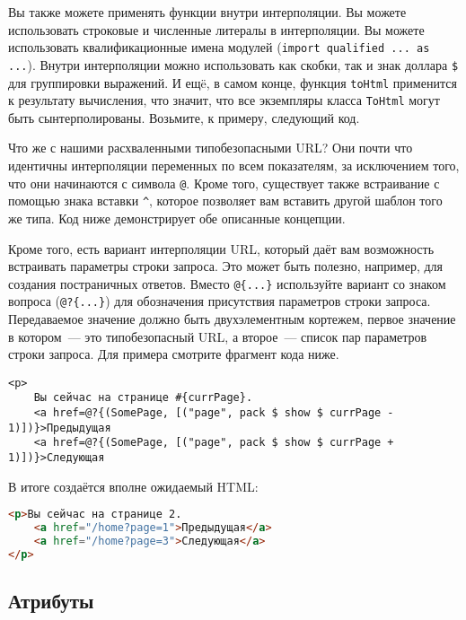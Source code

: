 Вы также можете применять функции внутри интерполяции. Вы можете использовать
строковые и численные литералы в интерполяции. Вы можете использовать
квалификационные имена модулей (\lstinline!import qualified ... as ...!).
Внутри
интерполяции можно использовать как скобки, так и знак доллара \texttt{\$} для
группировки выражений. И ещë, в самом конце, функция \lstinline!toHtml!
применится к результату вычисления, что значит, что все экземпляры класса
\lstinline!ToHtml! могут быть сынтерполированы. Возьмите, к примеру, следующий
код.


Что же с нашими расхваленными типобезопасными URL? Они почти что идентичны
интерполяции переменных по всем показателям, за исключением того, что они
начинаются с символа \texttt{@}. Кроме того, существует также встраивание с
помощью знака вставки \verb'^', которое позволяет вам вставить другой шаблон
того же типа.  Код ниже демонстрирует обе описанные концепции.


Кроме того, есть вариант интерполяции URL, который даёт вам возможность
встраивать параметры строки запроса. Это может быть полезно, например, для
создания постраничных ответов. Вместо \lstinline'@{...}' используйте вариант со
знаком вопроса (\lstinline'@?{...}') для обозначения присутствия параметров
строки запроса. Передаваемое значение должно быть двухэлементным кортежем,
первое значение в котором~--- это типобезопасный URL, а второе~--- список пар
параметров строки запроса. Для примера смотрите фрагмент кода ниже.
\begin{lstlisting}[caption=Интерполяция URL с параметрами в строке запроса]
<p>
    Вы сейчас на странице #{currPage}.
    <a href=@?{(SomePage, [("page", pack $ show $ currPage - 1)])}>Предыдущая
    <a href=@?{(SomePage, [("page", pack $ show $ currPage + 1)])}>Следующая
\end{lstlisting}
В итоге создаётся вполне ожидаемый HTML:
\begin{lstlisting}[language=HTML]
<p>Вы сейчас на странице 2.
    <a href="/home?page=1">Предыдущая</a>
    <a href="/home?page=3">Следующая</a>
</p>
\end{lstlisting}

\subsection{Атрибуты}

